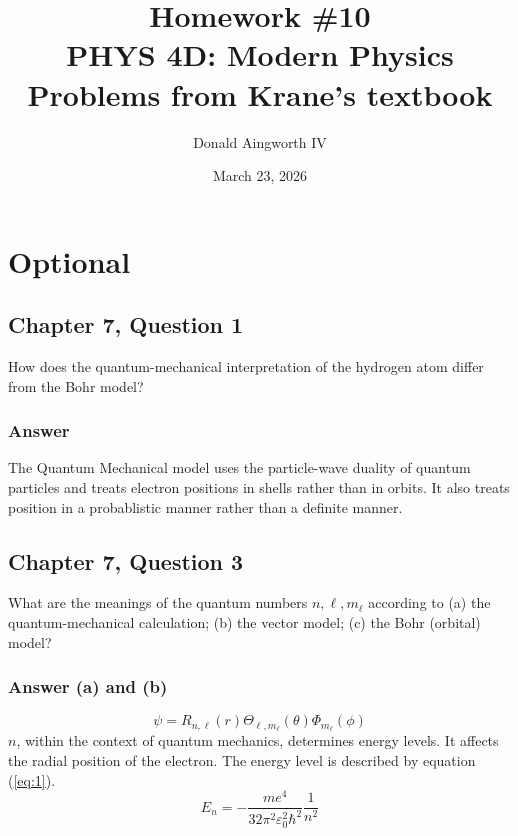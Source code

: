 \documentclass[12pt]{article}
\title{
    Homework \#10
    \\  \small
    PHYS 4D: Modern Physics
    \\
    Problems from Krane's textbook
    }
\author{Donald Aingworth IV}
\date{March 23, 2026}
\begin{document}
    \maketitle

    \section{Optional}
        \subsection{Chapter 7, Question 1}
            How does the quantum-mechanical interpretation of the hydrogen atom differ from the Bohr model?

            \subsubsection{Answer}
                The Quantum Mechanical model uses the particle-wave duality of quantum particles and treats electron positions in shells rather than in orbits.
                It also treats position in a probablistic manner rather than a definite manner.

        \subsection{Chapter 7, Question 3}
            What are the meanings of the quantum numbers $n, \ell, m_\ell$ according to (a) the quantum-mechanical calculation; (b) the vector model; (c) the Bohr (orbital) model?

            \subsubsection{Answer (a) and (b)}
                \begin{equation}
                    \psi = R_{n,\ell}(r) \Theta_{\ell, m_\ell}(\theta) \Phi_{m_\ell}(\phi)
                \end{equation}
                $n$, within the context of quantum mechanics, determines energy levels.
                It affects the radial position of the electron.
                The energy level is described by equation (\ref{eq:1}).
                \begin{equation}
                    \label{eq:1}
                    E_n = -\frac{me^4}{32\pi^2 \varepsilon_0^2 \hbar^2} \frac{1}{n^2}
                \end{equation}
\end{document}
